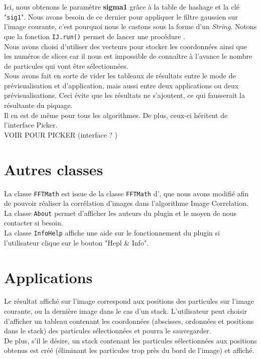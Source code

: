 Ici, nous obtenons le paramètre \textbf{sigma1} grâce à la table de hashage et la clé "\texttt{sig1}". Nous avons besoin de ce dernier pour appliquer le filtre gaussien sur l'image courante, c'est pourquoi nous le castons sous la forme d'un \emph{String}. Notons que la fonction \texttt{IJ.run()} permet de lancer une procédure \imj. \\
Nous avons choisi d'utiliser des vecteurs pour stocker les coordonnées ainsi que les numéros de slices car il nous est impossible de connaître à l'avance le nombre de particules qui vont être sélectionnées. \\
Nous avons fait en sorte de vider les tableaux de résultats entre le mode de prévisualisation et d'application, mais aussi entre deux applications ou deux prévisualisations. Ceci évite que les résultats ne s'ajoutent, ce qui fausserait la résultante du piquage. \\
Il en est de même pour tous les algorithmes. De plus, ceux-ci héritent de l'interface Picker. \\ 

VOIR POUR PICKER (interface ? ) \\

\section{Autres classes}

La classe \texttt{FFTMath} est issue de la classe \texttt{FFTMath} d'\imj, que nous avons modifié afin de pouvoir réaliser la corrélation d'images dans l'algorithme Image Correlation. \\

La classe \texttt{About} permet d'afficher les auteurs du plugin et le moyen de nous contacter si besoin. \\

La classe \texttt{InfoHelp} affiche une aide sur le fonctionnement du plugin si l'utilisateur  clique sur le bouton "Hepl \& Info". 


\section{Applications}

Le résultat affiché sur l'image correspond aux positions des particules sur l'image courante, ou la dernière image dans le cas d'un stack.
L'utilisateur peut choisir d'afficher un tableau contenant les coordonnées (abscisses, ordonnées et positions dans le stack) des particules sélectionnées et pourra le sauvegarder. \\
De plus, s'il le désire, un stack contenant les particules sélectionnées aux positions obtenus est créé (éliminant les particules trop près du bord de l'image) et affiché.

